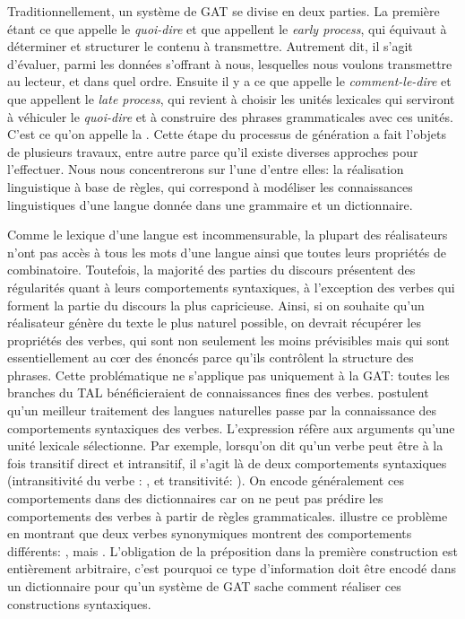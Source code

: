 Traditionnellement, un système de \ac{GAT} se divise en deux parties. La première étant ce que \cite{DanlosPresentationmodelegeneration1983} appelle le \emph{quoi-dire} et que \cite{gatt18} appellent le \emph{early process}, qui équivaut à déterminer et structurer le contenu à transmettre. Autrement dit, il s'agit d'évaluer, parmi les données s'offrant à nous, lesquelles nous voulons transmettre au lecteur, et dans quel ordre. Ensuite il y a ce que \citeauthor{DanlosPresentationmodelegeneration1983} appelle le \emph{comment-le-dire} et que \citeauthor{gatt18} appellent le \emph{late process}, qui revient à choisir les unités lexicales qui serviront à véhiculer le \emph{quoi-dire} et à construire des phrases grammaticales avec ces unités. C'est ce qu'on appelle la . Cette étape du processus de génération a fait l'objets de plusieurs travaux, entre autre parce qu'il existe diverses approches pour l'effectuer. Nous nous concentrerons sur l'une d'entre elles: la réalisation linguistique à base de règles, qui correspond à modéliser les connaissances linguistiques d'une langue donnée dans une grammaire et un dictionnaire.

Comme le lexique d'une langue est incommensurable, la plupart des réalisateurs n'ont pas accès à tous les mots d'une langue ainsi que toutes leurs propriétés de combinatoire. Toutefois, la majorité des parties du discours présentent des régularités quant à leurs comportements syntaxiques, à l'exception des verbes qui forment la partie du discours la plus capricieuse. Ainsi, si on souhaite qu'un réalisateur génère du texte le plus naturel possible, on devrait récupérer les propriétés des verbes, qui sont non seulement les moins prévisibles mais qui sont essentiellement au c\oe{}r des énoncés parce qu'ils contrôlent la structure des phrases. Cette problématique ne s'applique pas uniquement à la \ac{GAT}: toutes les branches du \ac{TAL} bénéficieraient de connaissances fines des verbes. \cite{SchulerVerbnetBroadcoverageComprehensive2005,Korhonenlargesubcategorizationlexicon2006} postulent qu'un meilleur traitement des langues naturelles passe par la connaissance des comportements syntaxiques des verbes. L'expression  réfère aux arguments qu'une unité lexicale sélectionne. Par exemple, lorsqu'on dit qu'un verbe peut être à la fois transitif direct et intransitif, il s'agit là de deux comportements syntaxiques (intransitivité du verbe : , et transitivité: ). On encode généralement ces comportements dans des dictionnaires car on ne peut pas prédire les comportements des verbes à partir de règles grammaticales. \cite{MilicevicSchemaregimepont2009} illustre ce problème en montrant que deux verbes synonymiques montrent des comportements différents: , mais . L'obligation de la préposition dans la première construction est entièrement arbitraire, c'est pourquoi ce type d'information doit être encodé dans un dictionnaire pour qu'un système de \ac{GAT} sache comment réaliser ces constructions syntaxiques.


